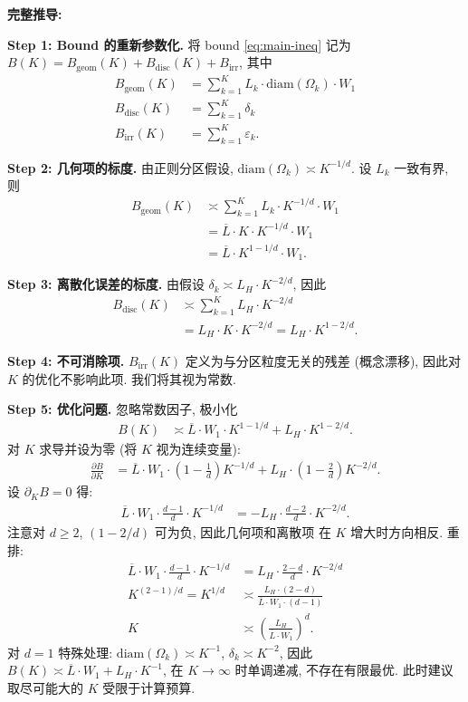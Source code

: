 \documentclass[12pt,a4paper]{article}
\newcommand{\Wass}{W_1}
\newcommand{\diam}{\mathrm{diam}}
\begin{document}
\medskip\noindent
\textbf{完整推导:}

\textbf{Step 1: Bound 的重新参数化.}
将 bound \eqref{eq:main-ineq} 记为
$B(K) = B_{\mathrm{geom}}(K) + B_{\mathrm{disc}}(K) + B_{\mathrm{irr}}$,
其中
\begin{align*}
    B_{\mathrm{geom}}(K) &= \sum_{k=1}^K L_k\cdot\diam(\Omega_k)\cdot\Wass \\
    B_{\mathrm{disc}}(K) &= \sum_{k=1}^K \delta_k \\
    B_{\mathrm{irr}}(K) &= \sum_{k=1}^K \varepsilon_k.
\end{align*}

\textbf{Step 2: 几何项的标度.}
由正则分区假设, $\diam(\Omega_k)\asymp K^{-1/d}$.
设 $L_k$ 一致有界, 则
\begin{align*}
    B_{\mathrm{geom}}(K) &\asymp \sum_{k=1}^K L_k\cdot K^{-1/d}\cdot\Wass \\
    &= \overline{L}\cdot K\cdot K^{-1/d}\cdot\Wass \\
    &= \overline{L}\cdot K^{1-1/d}\cdot\Wass.
\end{align*}

\textbf{Step 3: 离散化误差的标度.}
由假设 $\delta_k\asymp L_H\cdot K^{-2/d}$, 因此
\begin{align*}
    B_{\mathrm{disc}}(K) &\asymp \sum_{k=1}^K L_H\cdot K^{-2/d} \\
    &= L_H\cdot K\cdot K^{-2/d} = L_H\cdot K^{1-2/d}.
\end{align*}

\textbf{Step 4: 不可消除项.}
$B_{\mathrm{irr}}(K)$ 定义为与分区粒度无关的残差 (概念漂移),
因此对 $K$ 的优化不影响此项. 我们将其视为常数.

\textbf{Step 5: 优化问题.}
忽略常数因子, 极小化
\begin{align*}
    B(K) &\asymp \overline{L}\cdot\Wass\cdot K^{1-1/d}
            + L_H\cdot K^{1-2/d}.
\end{align*}
对 $K$ 求导并设为零 (将 $K$ 视为连续变量):
\begin{align*}
    \frac{\partial B}{\partial K}
    &= \overline{L}\cdot\Wass\cdot\left(1-\frac1d\right)K^{-1/d}
       + L_H\cdot\left(1-\frac2d\right)K^{-2/d}.
\end{align*}
设 $\partial_K B = 0$ 得:
\begin{align*}
    \overline{L}\cdot\Wass\cdot\frac{d-1}{d}\cdot K^{-1/d}
    &= -L_H\cdot\frac{d-2}{d}\cdot K^{-2/d}.
\end{align*}
注意对 $d\geq 2$, $(1-2/d)$ 可为负, 因此几何项和离散项
在 $K$ 增大时方向相反. 重排:
\begin{align*}
    \overline{L}\cdot\Wass\cdot\frac{d-1}{d}\cdot K^{-1/d}
    &= L_H\cdot\frac{2-d}{d}\cdot K^{-2/d} \\
    K^{(2-1)/d} = K^{1/d} &\asymp \frac{L_H\cdot(2-d)}
                                   {\overline{L}\cdot\Wass\cdot(d-1)} \\
    K &\asymp \left(\frac{L_H}{\overline{L}\cdot\Wass}\right)^d.
\end{align*}
对 $d=1$ 特殊处理: $\diam(\Omega_k)\asymp K^{-1}$,
$\delta_k\asymp K^{-2}$, 因此
$B(K)\asymp \overline{L}\cdot\Wass + L_H\cdot K^{-1}$,
在 $K\to\infty$ 时单调递减, 不存在有限最优. 此时建议
取尽可能大的 $K$ 受限于计算预算.
\end{document}
